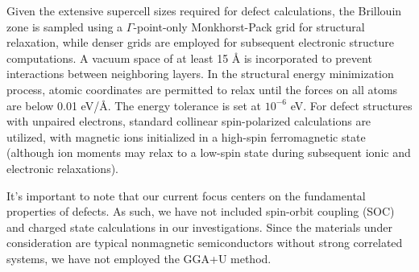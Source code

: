 Given the extensive supercell sizes required for defect calculations, the Brillouin zone is sampled using a $\Gamma$-point-only Monkhorst-Pack grid for structural relaxation, while denser grids are employed for subsequent electronic structure computations. A vacuum space of at least 15 Å is incorporated to prevent interactions between neighboring layers. In the structural energy minimization process, atomic coordinates are permitted to relax until the forces on all atoms are below 0.01 eV/Å. The energy tolerance is set at $10^{-6}$ eV. For defect structures with unpaired electrons, standard collinear spin-polarized calculations are utilized, with magnetic ions initialized in a high-spin ferromagnetic state (although ion moments may relax to a low-spin state during subsequent ionic and electronic relaxations).

It's important to note that our current focus centers on the fundamental properties of defects. As such, we have not included spin-orbit coupling (SOC) and charged state calculations in our investigations. Since the materials under consideration are typical nonmagnetic semiconductors without strong correlated systems, we have not employed the GGA+U method. 



